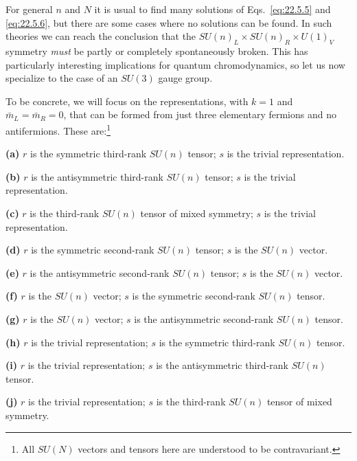 For general $n$ and $N$ it is usual to find many solutions of
Eqs.~\eqref{eq:22.5.5} and \eqref{eq:22.5.6}, but there are some cases
where no solutions can be found. In such theories we can reach the
conclusion that the $SU(n)_L\times SU(n)_R\times U(1)_V$ symmetry \emph{must}
be partly or completely spontaneously broken. This has particularly
interesting implications for quantum chromodynamics, so let us now
specialize to the case of an $SU(3)$ gauge group.

To be concrete, we will focus on the representations, with $k=1$ and
$\bar m_L=\bar m_R=0$, that can be formed from just three elementary
fermions and no antifermions. These are:\footnote{All $SU(N)$ vectors and
tensors here are understood to be contravariant.}

\medskip
\noindent\textbf{(a)} $r$ is the symmetric third-rank $SU(n)$ tensor; $s$
is the trivial representation.

\noindent\textbf{(b)} $r$ is the antisymmetric third-rank $SU(n)$ tensor;
$s$ is the trivial representation.

\noindent\textbf{(c)} $r$ is the third-rank $SU(n)$ tensor of mixed
symmetry; $s$ is the trivial representation.

\noindent\textbf{(d)} $r$ is the symmetric second-rank $SU(n)$ tensor; $s$
is the $SU(n)$ vector.

\noindent\textbf{(e)} $r$ is the antisymmetric second-rank $SU(n)$ tensor;
$s$ is the $SU(n)$ vector.

\noindent\textbf{(f)} $r$ is the $SU(n)$ vector; $s$ is the symmetric
second-rank $SU(n)$ tensor.

\noindent\textbf{(g)} $r$ is the $SU(n)$ vector; $s$ is the antisymmetric
second-rank $SU(n)$ tensor.

\noindent\textbf{(h)} $r$ is the trivial representation; $s$ is the
symmetric third-rank $SU(n)$ tensor.

\noindent\textbf{(i)} $r$ is the trivial representation; $s$ is the
antisymmetric third-rank $SU(n)$ tensor.

\noindent\textbf{(j)} $r$ is the trivial representation; $s$ is the
third-rank $SU(n)$ tensor of mixed symmetry.
\medskip

